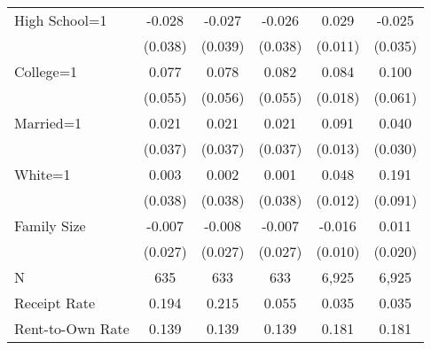 {\begin{tabular}{l*{5}{c}}
\;High School=1 &   -0.028         &   -0.027         &   -0.026         &    0.029\sym{*}  &   -0.025         \\
                &  (0.038)         &  (0.039)         &  (0.038)         &  (0.011)         &  (0.035)         \\
\;College=1     &    0.077         &    0.078         &    0.082         &    0.084\sym{***}&    0.100\sym{+}  \\
                &  (0.055)         &  (0.056)         &  (0.055)         &  (0.018)         &  (0.061)         \\
\;Married=1     &    0.021         &    0.021         &    0.021         &    0.091\sym{***}&    0.040         \\
                &  (0.037)         &  (0.037)         &  (0.037)         &  (0.013)         &  (0.030)         \\
\;White=1       &    0.003         &    0.002         &    0.001         &    0.048\sym{***}&    0.191\sym{*}  \\
                &  (0.038)         &  (0.038)         &  (0.038)         &  (0.012)         &  (0.091)         \\
\;Family Size   &   -0.007         &   -0.008         &   -0.007         &   -0.016         &    0.011         \\
                &  (0.027)         &  (0.027)         &  (0.027)         &  (0.010)         &  (0.020)         \\
\midrule
N               &      635         &      633         &      633         &    6,925         &    6,925         \\
Receipt Rate    &    0.194         &    0.215         &    0.055         &    0.035         &    0.035         \\
Rent-to-Own Rate&    0.139         &    0.139         &    0.139         &    0.181         &    0.181         \\
\bottomrule
\end{tabular}
}
